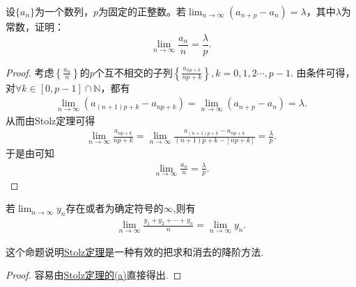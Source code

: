 \documentclass[../../main.tex]{subfiles}
\begin{document}
\begin{proposition}
设$\{a_n\}$为一个数列，$p$为固定的正整数。若$\lim_{n \to \infty} (a_{n+p} - a_n) = \lambda$，其中$\lambda$为常数，证明：
\[
\lim_{n \to \infty} \frac{a_n}{n} = \frac{\lambda}{p}.
\]
\end{proposition}
\begin{proof}
考虑$\left\{ \frac{a_n}{n} \right\}$的$p$个互不相交的子列$\left\{ \frac{a_{np+k}}{np+k} \right\},k=0,1,2\cdots,p-1$.
由条件可得，对$\forall k\in \left[ 0,p-1 \right] \cap \mathbb{N}$，都有
\begin{align*}
\lim_{n\rightarrow \infty}\left( a_{\left( n+1 \right) p+k}-a_{np+k} \right)=\lim_{n\rightarrow \infty}\left( a_{n+p}-a_n \right)=\lambda.
\end{align*}
从而由Stolz定理可得
\begin{align*}
\lim_{n\rightarrow \infty}\frac{a_{np+k}}{np+k}=\lim_{n\rightarrow \infty}\frac{a_{\left( n+1 \right) p+k}-a_{np+k}}{\left( n+1 \right) p+k-\left[ np+k \right]}=\frac{\lambda}{p}.
\end{align*}
于是由可知
\begin{align*}
\lim_{n\rightarrow \infty}\frac{a_n}{n}=\frac{\lambda}{p}.
\end{align*}

\end{proof}

\begin{proposition}[Cauchy命题]\label{proposition:Cauchy命题}
若\(\lim_{n \to \infty} y_n\)存在或者为确定符号的\(\infty\),则有
\begin{align*}
\lim_{n \to \infty} \frac{y_1 + y_2 + \cdots + y_n}{n} = \lim_{n \to \infty} y_n.
\end{align*}
\end{proposition}
\begin{note}
这个命题说明\hyperref[theorem:Stolz定理]{Stolz定理}是一种有效的把求和消去的降阶方法.
\end{note}
\begin{proof}
容易由\hyperref[theorem:Stolz定理]{Stolz定理的(a)}直接得出.

\end{proof}
\end{document}

